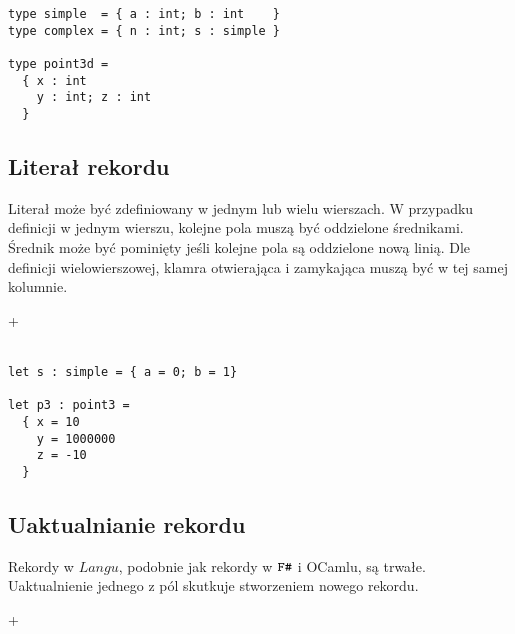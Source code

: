 \documentclass[declaration,shortabstract]{iithesis}
\begin{document}
\begin{lstlisting}[frame=single, caption=Definicja rekordu.]
type simple  = { a : int; b : int    }
type complex = { n : int; s : simple }

type point3d = 
  { x : int 
    y : int; z : int 
  }
\end{lstlisting}

\subsection{Literał rekordu}

Literał może być zdefiniowany w jednym lub wielu wierszach. W przypadku 
definicji w jednym wierszu, kolejne pola muszą być oddzielone średnikami. 
Średnik może być pominięty jeśli kolejne pola są oddzielone nową linią. 
Dle definicji wielowierszowej, klamra otwierająca i zamykająca muszą być w tej 
samej kolumnie.

\begin{bnf*}
  {   \bnfts{=}  
    +  
  }\\
  {  \bnfts{ = } 
     \bnfor {} \bnfts{ = } 
    \bnfts{ ; }
  }\\
\end{bnf*}

\begin{lstlisting}[frame=single, caption=Literał rekordu.]
let s : simple = { a = 0; b = 1}

let p3 : point3 = 
  { x = 10
    y = 1000000 
    z = -10 
  }
\end{lstlisting}

\subsection{Uaktualnianie rekordu}

Rekordy w $Langu$, podobnie jak rekordy w $\verb!F#!$ i OCamlu, są trwałe. 
Uaktualnienie jednego z pól skutkuje stworzeniem nowego rekordu. 

\begin{bnf*}
  { \bnfts{ \{ }   
    + \bnfts{ \} } 
  }\\
  {  \bnfts{=} 
     \bnfor {} \bnfts{=} 
    \bnfts{;}
  }\\
\end{bnf*}
\end{document}
